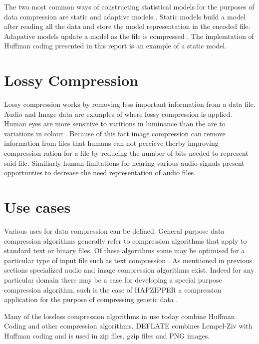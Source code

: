 \doublespacing
\singlespacing
The two most common ways of constructing statistical models for the purposes of data compression are static and adaptive models . Static models build a model after reading all the data and store the model representation in the encoded file. Adapative models update a model as the file is compressed \cite{WikiLossless}. The implemtation of Huffman coding presented in this report is an example of a static model.


\doublespacing
\singlespacing
\section{Lossy Compression}


\singlespacing


Lossy compression works by removing less important information from a data file. Audio and Image data are examples of where lossy compression is applied. Human eyes are more sensitive to varitions in luminance than the are to variations in colour \cite{WikiDataCompression}. Because of this fact image compression can remove information from files that humans can not percieve therby improving compression ration for a file by reducing the number of bits needed to represent said file. Similiarly human limitations for hearing various audio signals present opportunties to decrease the need representation of audio files.


\doublespacing
\singlespacing
\section{Use cases}


\singlespacing


Various uses for data compression can be defined. General purpose data compression algorithms generally refer to compression algorithms that apply to standard text or binary files. Of these algorithms some may be optimised for a particular type of input file such as text compression . As mentiioned in previous sections specialized audio and image compression algorithms exist. Indeed for any particular domain there may be a case for developing a special purpose compression algorithm, such is the case of HAPZIPPER a compression application for the purpose of compressing genetic data \cite{WikiLossless}.


\doublespacing
\singlespacing


Many of the lossless compression algorithms in use today combine Huffman Coding and other compression algorithms. DEFLATE combines Lempel-Ziv with Huffman coding and is used in zip files, gzip files and PNG images. 

